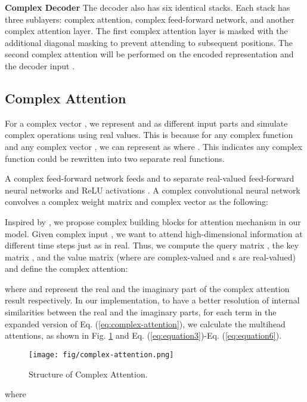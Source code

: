 \documentclass{article}
\begin{document}
\textbf{Complex Decoder} The decoder also has six identical stacks. Each stack has three sublayers: complex attention, complex feed-forward network, and another complex attention layer. The first complex attention layer is masked with the additional diagonal masking to prevent attending to subsequent positions. The second complex attention will be performed on the encoded representation  and the decoder input . 

\subsection{Complex Attention}

For a complex vector , we represent  and  as different input parts and simulate complex operations using real values. This is because for any complex function  and any complex vector , we can represent  as  where   \cite{arjovsky2016unitary}. This indicates any complex function could be rewritten into two separate real functions.

A complex feed-forward network feeds  and  to separate real-valued feed-forward neural networks and ReLU activations \cite{trabelsi2017deep}. A complex convolutional neural network \cite{trabelsi2017deep} convolves a complex weight matrix  and complex vector  as the following:


Inspired by \cite{vaswani2017attention}, we propose complex building blocks for attention mechanism in our model. Given complex input , we want to attend high-dimensional information at different time steps just as in real. Thus, we compute the query matrix , the key matrix , and the value matrix  (where  are complex-valued and s are real-valued) and define the complex attention: 


where  and  represent the real and the imaginary part of the complex attention result respectively. In our implementation, to have a better resolution of internal similarities between the real and the imaginary parts, for each term in the expanded version of Eq. (\ref{eq:complex-attention}), we calculate the multihead attentions, as shown in Fig. \ref{fig:spec} and Eq. (\ref{eq:equation3})-Eq. (\ref{eq:equation6}).

\begin{figure}[H]
\texttt{[image: fig/complex-attention.png]}
\caption{Structure of Complex Attention.}
\label{fig:spec}
\end{figure}


where
\end{document}
